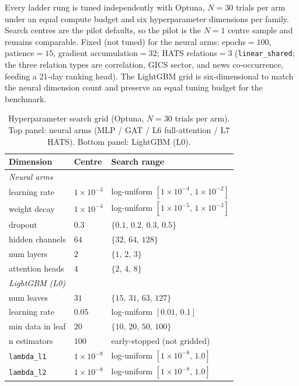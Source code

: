 \documentclass{article}
\begin{document}
Every ladder rung is tuned independently with Optuna, $N=30$ trials per arm under an equal compute budget and six hyperparameter dimensions per family. Search centres are the pilot defaults, so the pilot is the $N=1$ centre sample and remains comparable. Fixed (not tuned) for the neural arms: epochs${}=100$, patience${}=15$, gradient accumulation${}=32$; HATS relations${}=3$ (\texttt{linear\_shared}; the three relation types are correlation, GICS sector, and news co-occurrence, feeding a 21-day ranking head).
The LightGBM grid is six-dimensional to match the neural dimension count and preserve an equal tuning budget for the benchmark.

\begin{table}[h]
  \centering
  \caption{Hyperparameter search grid (Optuna, $N=30$ trials per arm). Top panel: neural arms (MLP / GAT / L6 full-attention / L7 HATS). Bottom panel: LightGBM (L0).}
  \label{app:setup:tab:grid}
  {\small
  \setlength{\tabcolsep}{4pt}
  \begin{tabular}{lll}
    \toprule
    Dimension & Centre & Search range \\
    \midrule
    \multicolumn{3}{l}{\emph{Neural arms}} \\
    learning rate    & $1\times10^{-3}$ & log-uniform $[1\times10^{-4},\,1\times10^{-2}]$ \\
    weight decay     & $1\times10^{-4}$ & log-uniform $[1\times10^{-5},\,1\times10^{-3}]$ \\
    dropout          & $0.3$            & $\{0.1,\,0.2,\,0.3,\,0.5\}$ \\
    hidden channels  & $64$             & $\{32,\,64,\,128\}$ \\
    num layers       & $2$              & $\{1,\,2,\,3\}$ \\
    attention heads  & $4$              & $\{2,\,4,\,8\}$ \\
    \midrule
    \multicolumn{3}{l}{\emph{LightGBM (L0)}} \\
    num leaves        & $31$             & $\{15,\,31,\,63,\,127\}$ \\
    learning rate     & $0.05$           & log-uniform $[0.01,\,0.1]$ \\
    min data in leaf  & $20$             & $\{10,\,20,\,50,\,100\}$ \\
    n estimators      & $100$            & early-stopped (not gridded) \\
    \texttt{lambda\_l1} & $1\times10^{-8}$ & log-uniform $[1\times10^{-8},\,1.0]$ \\
    \texttt{lambda\_l2} & $1\times10^{-8}$ & log-uniform $[1\times10^{-8},\,1.0]$ \\
    \bottomrule
  \end{tabular}
  }
\end{table}
\end{document}

